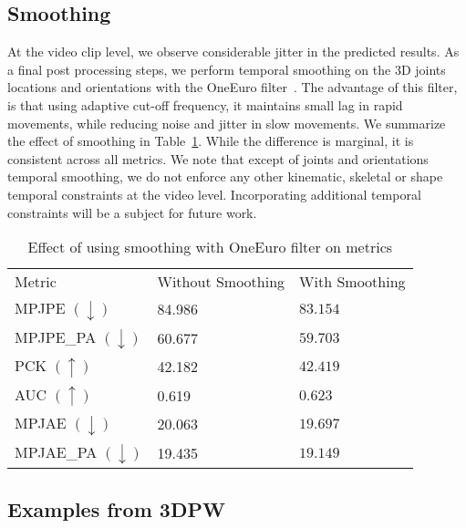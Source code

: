 \documentclass[runningheads]{llncs}
\begin{document}
\subsection{Smoothing}

At the video clip level, we observe considerable jitter in the predicted results. As a final post processing steps, we perform temporal smoothing on the 3D joints locations and orientations with the OneEuro filter~\cite{casiez20121}. The advantage of this filter, is that using adaptive cut-off frequency, it maintains small lag in rapid movements, while reducing noise and jitter in slow movements. We summarize the effect of smoothing in Table~\ref{table:smoothing}. While the difference is marginal, it is consistent across all metrics. We note that except of joints and orientations temporal smoothing, we do not enforce any other kinematic, skeletal or shape temporal constraints at the video level. Incorporating additional temporal constraints will be a subject for future work.


\vspace{-20pt}
\setlength{\tabcolsep}{4pt}
\begin{table}
	\begin{center}
		\caption{Effect of using smoothing with OneEuro filter on metrics}
		\label{table:smoothing}
		\begin{tabular}{lll}
			\hline\noalign{\smallskip}
			Metric & Without Smoothing & With Smoothing\\
			\noalign{\smallskip}
			\hline
			\noalign{\smallskip}
			MPJPE $ (\downarrow) $ & 84.986 & $ \bm{83.154} $\\
			{MPJPE\_PA} $ (\downarrow) $& 60.677 & $ \bm{59.703} $\\
			PCK $ (\uparrow) $& 42.182 & $ \bm{42.419} $\\
			AUC $ (\uparrow) $& 0.619 & $ \bm{0.623} $\\
			MPJAE $ (\downarrow) $& 20.063 & $ \bm{19.697} $\\
			{MPJAE\_PA} $ (\downarrow) $& 19.435 & $ \bm{19.149} $\\
			\hline
		\end{tabular}
	\end{center}
\end{table}
\setlength{\tabcolsep}{1.4pt}


\subsection{Examples from 3DPW}
\end{document}
